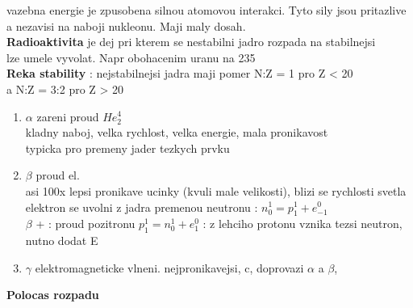 \documentclass{report}
\begin{document}
vazebna energie je zpusobena silnou atomovou interakci. Tyto sily jsou pritazlive a nezavisi na naboji nukleonu. Maji maly dosah. \\


\textbf{Radioaktivita} je dej pri kterem se nestabilni jadro rozpada na stabilnejsi \\
lze umele vyvolat. Napr obohacenim uranu na 235 \\
\textbf{Reka stability} : nejstabilnejsi jadra maji pomer N:Z = 1 pro Z < 20 \\
a N:Z = 3:2 pro Z > 20 \\
\begin{enumerate}[label=\bfseries\tiny\protect\circled{\small\arabic*}]
  \item $\alpha$ zareni proud  $He_2^4$ \\
    kladny naboj, velka rychlost, velka energie, mala pronikavost \\
    typicka pro premeny jader tezkych prvku \\
  \item $\beta$ proud el. \\
    asi 100x lepsi pronikave ucinky (kvuli male velikosti), blizi se rychlosti svetla \\
    elektron se uvolni z jadra premenou neutronu : $n_0^1=p_1^1+e_{-1}^0$ \\
    $\beta$ + : proud pozitronu $p_1^1=n_0^1+e_{1}^0$ : z lehciho protonu vznika tezsi neutron, nutno dodat E \\
  \item $\gamma$ elektromagneticke vlneni. nejpronikavejsi, c, doprovazi $\alpha$ a $\beta$,  \\
\end{enumerate}

\textbf{Polocas rozpadu}  \\
\end{document}
